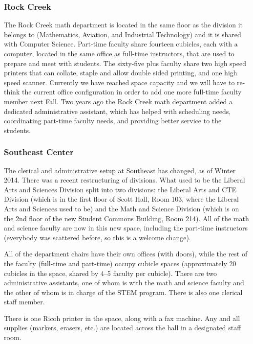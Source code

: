 \subsubsection{Rock Creek}
The Rock Creek math department is located in the same floor as the division it belongs to (Mathematics, Aviation, and Industrial Technology) and it is shared with Computer Science.   Part-time faculty share fourteen cubicles, each with a computer, located in the same office as full-time instructors, that are used to prepare and meet with students. The sixty-five plus faculty share two high speed printers that can collate, staple and allow double sided printing, and one high speed scanner. Currently we have reached space capacity and we will have to re-think the current office configuration in order to add one more full-time faculty member next Fall.  Two years ago the Rock Creek math department added a dedicated administrative assistant, which has helped with scheduling needs, coordinating part-time faculty needs, and providing better service to the students.  

\subsubsection{Southeast Center}
The clerical and administrative setup at Southeast has changed, as of Winter 2014. There was a recent restructuring of divisions. What used to be the Liberal Arts and Sciences Division split into two divisions: the Liberal Arts and CTE Division (which is in the first floor of Scott Hall, Room 103, where the Liberal Arts and Sciences used to be) and the Math and Science Division (which is on the 2nd floor of the new Student Commons Building, Room 214). All of the math and science faculty are now in this new space, including the part-time instructors (everybody was scattered before, so this is a welcome change).

All of the department chairs have their own offices (with doors), while the rest of the faculty (full-time and part-time) occupy cubicle spaces (approximately 20 cubicles in the space, shared by 4--5 faculty per cubicle).  There are two administrative assistants, one of whom is with the math and science faculty and the other of whom is in charge of the STEM program.  There is also one clerical staff member.

There is one Ricoh printer in the space, along with a fax machine.  Any and all supplies (markers, erasers, etc.) are located across the hall in a designated staff room.

